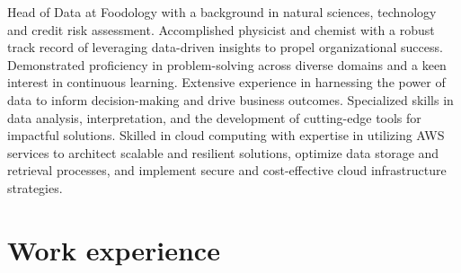 \documentclass[11pt, letterpaper, sans]{moderncv}        %
\begin{document}
\maketitle

\small{
Head of Data at Foodology with a background in natural sciences, technology and credit risk assessment. Accomplished physicist and chemist with a robust track record of leveraging data-driven insights to propel organizational success. Demonstrated proficiency in problem-solving across diverse domains and a keen interest in continuous learning. Extensive experience in harnessing the power of data to inform decision-making and drive business outcomes. Specialized skills in data analysis, interpretation, and the development of cutting-edge tools for impactful solutions. Skilled in cloud computing with expertise in utilizing AWS services to architect scalable and resilient solutions, optimize data storage and retrieval processes, and implement secure and cost-effective cloud infrastructure strategies.
}

\section{Work experience}
\end{document}
